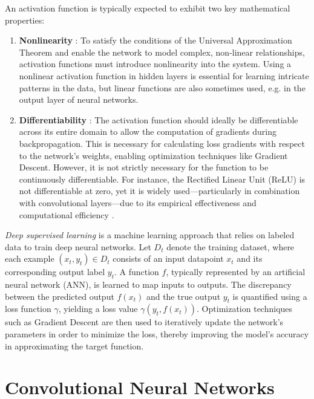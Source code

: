 An activation function is typically expected to exhibit two key mathematical properties:
\begin{enumerate}
  \item \textbf{Nonlinearity} \autocite{augustine2024surveyuniversalapproximationtheorems}: To satisfy the conditions of the Universal Approximation Theorem and enable the network to model complex, non-linear relationships, activation functions must introduce nonlinearity into the system. Using a nonlinear activation function in hidden layers is essential for learning intricate patterns in the data, but linear functions are also sometimes used, e.g. in the output layer of neural networks.
  \item \textbf{Differentiability} \autocite{sharma2017activation}: The activation function should ideally be differentiable across its entire domain to allow the computation of gradients during backpropagation. This is necessary for calculating loss gradients with respect to the network’s weights, enabling optimization techniques like Gradient Descent. However, it is not strictly necessary for the function to be continuously differentiable. For instance, the Rectified Linear Unit (ReLU) is not differentiable at zero, yet it is widely used—particularly in combination with convolutional layers—due to its empirical effectiveness and computational efficiency \autocite{alzubaidi2021review}.
\end{enumerate}

\begin{definition}
  \textit{Deep supervised learning} \autocite{alzubaidi2021review} \autocite{cun2015deeplearning} \autocite{oshea2015introductionconvolutionalneuralnetworks} is a machine learning approach that relies on labeled data to train deep neural networks. Let \(D_t\) denote the training dataset, where each example \((x_t, y_t) \in D_t\) consists of an input datapoint \(x_t\) and its corresponding output label \(y_t\). A function \(f\), typically represented by an artificial neural network (ANN), is learned to map inputs to outputs. The discrepancy between the predicted output \(f(x_t)\) and the true output \(y_t\) is quantified using a loss function \(\gamma\), yielding a loss value \(\gamma(y_t, f(x_t))\). Optimization techniques such as Gradient Descent are then used to iteratively update the network’s parameters in order to minimize the loss, thereby improving the model’s accuracy in approximating the target function.
\end{definition}

\section{Convolutional Neural Networks}

